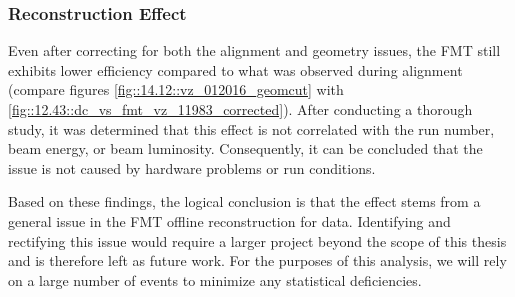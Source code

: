 \subsubsection{Reconstruction Effect}
\label{14.13::reconstruction_effect}
    Even after correcting for both the alignment and geometry issues, the FMT still exhibits lower efficiency compared to what was observed during alignment (compare figures \ref{fig::14.12::vz_012016_geomcut} with \ref{fig::12.43::dc_vs_fmt_vz_11983_corrected}).
    After conducting a thorough study, it was determined that this effect is not correlated with the run number, beam energy, or beam luminosity.
    Consequently, it can be concluded that the issue is not caused by hardware problems or run conditions.

    Based on these findings, the logical conclusion is that the effect stems from a general issue in the FMT offline reconstruction for data.
    Identifying and rectifying this issue would require a larger project beyond the scope of this thesis and is therefore left as future work.
    For the purposes of this analysis, we will rely on a large number of events to minimize any statistical deficiencies.
